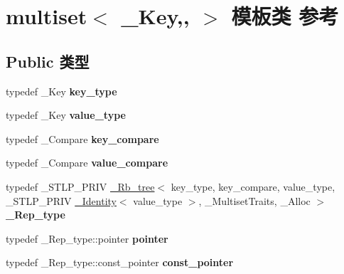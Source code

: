 \hypertarget{classmultiset}{}\section{multiset$<$ \+\_\+\+Key,, $>$ 模板类 参考}
\label{classmultiset}
\subsection*{Public 类型}
\begin{DoxyCompactItemize}
\item 
\mbox{\label{classmultiset_a965b3049a0b8b4194a7c79707e3c51d7}} 
typedef \+\_\+\+Key {\bfseries key\+\_\+type}
\item 
\mbox{\label{classmultiset_a6e7f960d58c0465446f09d706da17521}} 
typedef \+\_\+\+Key {\bfseries value\+\_\+type}
\item 
\mbox{\label{classmultiset_a8f80659e29ec51aebdad4a928af501a7}} 
typedef \+\_\+\+Compare {\bfseries key\+\_\+compare}
\item 
\mbox{\label{classmultiset_a12f507d10a4cc60d0f21402e72c902c2}} 
typedef \+\_\+\+Compare {\bfseries value\+\_\+compare}
\item 
\mbox{\label{classmultiset_a0a923e7eb128ec153457cae87ccca382}} 
typedef \+\_\+\+S\+T\+L\+P\+\_\+\+P\+R\+IV \hyperlink{class___rb__tree}{\+\_\+\+Rb\+\_\+tree}$<$ key\+\_\+type, key\+\_\+compare, value\+\_\+type, \+\_\+\+S\+T\+L\+P\+\_\+\+P\+R\+IV \hyperlink{struct___identity}{\+\_\+\+Identity}$<$ value\+\_\+type $>$, \+\_\+\+Multiset\+Traits, \+\_\+\+Alloc $>$ {\bfseries \+\_\+\+Rep\+\_\+type}
\item 
\mbox{\label{classmultiset_ad73f2a0669aa7ef7f6bf04cd830e1740}} 
typedef \+\_\+\+Rep\+\_\+type\+::pointer {\bfseries pointer}
\item 
\mbox{\label{classmultiset_a3cb42dc6efb3c23b04e165006f503be7}} 
typedef \+\_\+\+Rep\+\_\+type\+::const\+\_\+pointer {\bfseries const\+\_\+pointer}
\item 
\mbox{\label{classmultiset_add080f9fe229091a0030832afd059186}} 

\end{DoxyCompactItemize}

